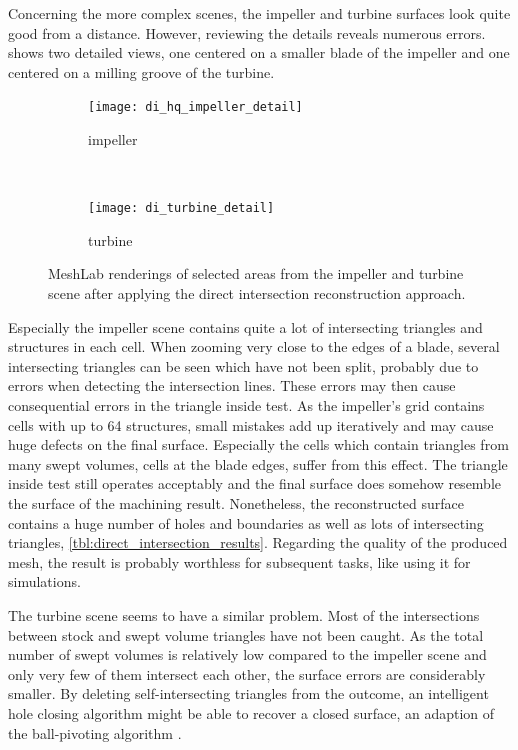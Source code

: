 Concerning the more complex scenes, the impeller and turbine surfaces look quite good from a distance.
However, reviewing the details reveals numerous errors.
 shows two detailed views, one centered on a smaller blade of the impeller and one centered on a milling groove of the turbine.
%
\begin{figure}[h]
	\centering
	\begin{subfigure}[b]{\textwidth}
		\centering
		\texttt{[image: di\_hq\_impeller\_detail]}
		\caption{impeller}
		\label{fig:di_impeller_detail}
	\end{subfigure}\\
	\begin{subfigure}[b]{\textwidth}
		\centering
		\texttt{[image: di\_turbine\_detail]}
		\caption{turbine}
		\label{fig:di_turbine_detail}
	\end{subfigure}
	\caption{
		MeshLab renderings of selected areas from the impeller  and turbine  scene after applying the direct intersection reconstruction approach.
	}
	\label{fig:di_scenes_artifacts}
\end{figure}
%
Especially the impeller scene contains quite a lot of intersecting triangles and structures in each cell.
When zooming very close to the edges of a blade, several intersecting triangles can be seen which have not been split, probably due to errors when detecting the intersection lines.
These errors may then cause consequential errors in \eg the triangle inside test.
As the impeller's grid contains cells with up to 64 structures, small mistakes add up iteratively and may cause huge defects on the final surface.
Especially the cells which contain triangles from many swept volumes, \ie cells at the blade edges, suffer from this effect.
The triangle inside test still operates acceptably and the final surface does somehow resemble the surface of the machining result.
Nonetheless, the reconstructed surface contains a huge number of holes and boundaries as well as lots of intersecting triangles, \cf \cref{tbl:direct_intersection_results}.
Regarding the quality of the produced mesh, the result is probably worthless for subsequent tasks, like using it for simulations.

The turbine scene seems to have a similar problem.
Most of the intersections between stock and swept volume triangles have not been caught.
As the total number of swept volumes is relatively low compared to the impeller scene and only very few of them intersect each other, the surface errors are considerably smaller.
By deleting self-intersecting triangles from the outcome, an intelligent hole closing algorithm might be able to recover a closed surface, \eg an adaption of the ball-pivoting algorithm \cite{bpa}.

